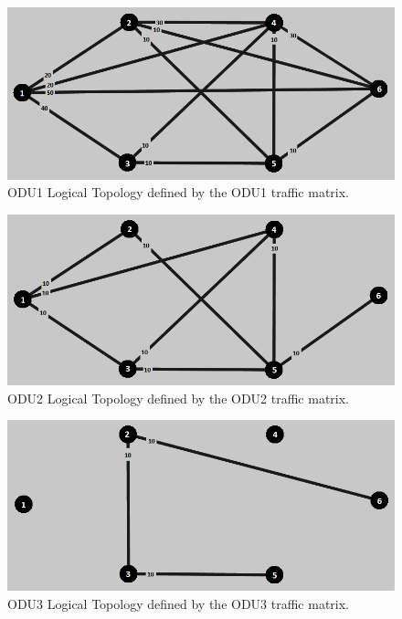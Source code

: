 \begin{figure}[H]
\centering
\includegraphics[width=13cm]{sdf/heuristic/opaque_survivability/medium/logical_topology_odu1_medium}
\caption{ODU1 Logical Topology defined by the ODU1 traffic matrix.}
\label{logical_ODU1_surv_ref_medium_heuristic}
\end{figure}

\begin{figure}[H]
\centering
\includegraphics[width=13cm]{sdf/heuristic/opaque_survivability/medium/logical_topology_odu2_medium}
\caption{ODU2 Logical Topology defined by the ODU2 traffic matrix.}
\label{logical_ODU2_surv_ref_medium_heuristic}
\end{figure}

\begin{figure}[H]
\centering
\includegraphics[width=13cm]{sdf/heuristic/opaque_survivability/medium/logical_topology_odu3_medium}
\caption{ODU3 Logical Topology defined by the ODU3 traffic matrix.}
\label{logical_ODU3_surv_ref_medium_heuristic}
\end{figure}

